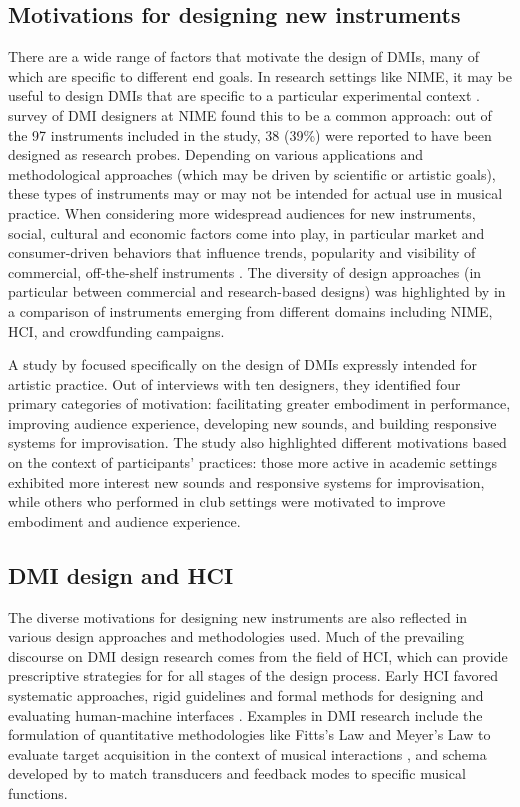 \documentclass[]{interact}
\theoremstyle{plain}%
\theoremstyle{definition}
\theoremstyle{remark}
\begin{document}
\subsection{Motivations for designing new instruments}
\label{ch3-sec:motivations-for-designing-new-instruments}

There are a wide range of factors that motivate the design of DMIs, many of which are specific to different end goals. In research settings like NIME, it may be useful to design DMIs that are specific to a particular experimental context \citep{Marquez-borbon2011}. \citet{Morreale2017} survey of DMI designers at NIME found this to be a common approach: out of the 97 instruments included in the study, 38 (39\%) were reported to have been designed as research probes. Depending on various applications and methodological approaches (which may be driven by scientific or artistic goals), these types of instruments may or may not be intended for actual use in musical practice. When considering more widespread audiences for new instruments, social, cultural and economic factors come into play, in particular market and consumer-driven behaviors that influence trends, popularity and visibility of commercial, off-the-shelf instruments \citep{Theberge1997}. The diversity of design approaches (in particular between commercial and research-based designs) was highlighted by \citet{mcpherson2019musical} in a comparison of instruments emerging from different domains including NIME, HCI, and crowdfunding campaigns. 

A study by \citet{Emerson2018} focused specifically on the design of DMIs expressly intended for artistic practice. Out of interviews with ten designers, they identified four primary categories of motivation: facilitating greater embodiment in performance, improving audience experience, developing new sounds, and building responsive systems for improvisation. The study also highlighted different motivations based on the context of participants' practices: those more active in academic settings exhibited more interest new sounds and responsive systems for improvisation, while others who performed in club settings were motivated to improve embodiment and audience experience.

\subsection{DMI design and HCI}
\label{ch3-sec:dmi-design-and-hci}

The diverse motivations for designing new instruments are also reflected in various design approaches and methodologies used. Much of the prevailing discourse on DMI design research comes from the field of HCI, which can provide prescriptive strategies for for all stages of the design process. Early HCI favored systematic approaches, rigid guidelines and formal methods for designing and evaluating human-machine interfaces \citep{Bodker2015}. Examples in DMI research include the formulation of quantitative methodologies like Fitts's Law and Meyer's Law to evaluate target acquisition in the context of musical interactions \citet{Wanderley2002}, and schema developed by \citet{Vertegaal1996c} to match transducers and feedback modes to specific musical functions.
\end{document}
